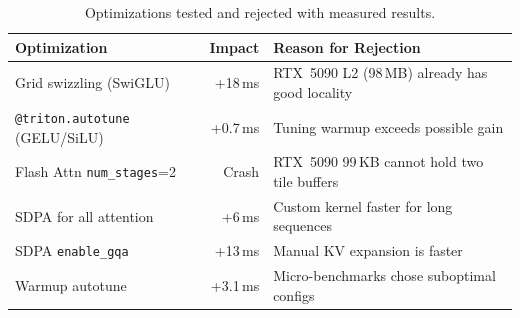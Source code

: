 \documentclass{article}
\begin{document}
\begin{table}[h]
\centering
\caption{Optimizations tested and rejected with measured results.}
\label{tab:rejected}
\small
\begin{tabular}{@{}lrl@{}}
\toprule
\textbf{Optimization} & \textbf{Impact} & \textbf{Reason for Rejection} \\
\midrule
Grid swizzling (SwiGLU) & +18\,ms & RTX~5090 L2 (98\,MB) already has good locality \\
\texttt{@triton.autotune} (GELU/SiLU) & +0.7\,ms & Tuning warmup exceeds possible gain \\
Flash Attn \texttt{num\_stages}=2 & Crash & RTX~5090 99\,KB cannot hold two tile buffers \\
SDPA for all attention & +6\,ms & Custom kernel faster for long sequences \\
SDPA \texttt{enable\_gqa} & +13\,ms & Manual KV expansion is faster \\
Warmup autotune & +3.1\,ms & Micro-benchmarks chose suboptimal configs \\
\bottomrule
\end{tabular}
\end{table}
\end{document}
